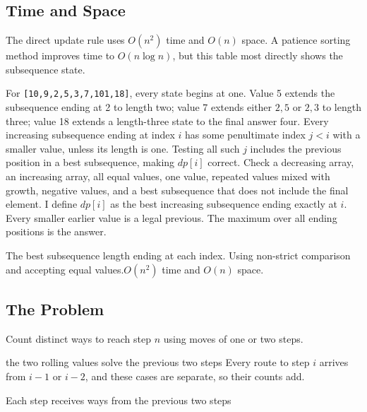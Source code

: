 \subsection{Time and Space}
The direct update rule uses \(O(n^2)\) time and \(O(n)\) space. A patience
sorting method improves time to \(O(n\log n)\), but this table most directly
shows the subsequence state.

\lessonexpansion
  {For \texttt{[10,9,2,5,3,7,101,18]}, every state begins at one. Value 5
   extends the subsequence ending at 2 to length two; value 7 extends either
   \(2,5\) or \(2,3\) to length three; value 18 extends a length-three state
   to the final answer four.}
  {Every increasing subsequence ending at index \(i\) has some penultimate
   index \(j<i\) with a smaller value, unless its length is one. Testing all
   such \(j\) includes the previous position in a best subsequence,
   making \(dp[i]\) correct.}
  {Check a decreasing array, an increasing array, all equal values, one value,
   repeated values mixed with growth, negative values, and a best subsequence
   that does not include the final element.}
  {I define \(dp[i]\) as the best increasing subsequence ending exactly at
   \(i\). Every smaller earlier value is a legal previous. The maximum over
   all ending positions is the answer.}

  {The best subsequence length ending at each index.}
  {Using non-strict comparison and accepting equal values.}{$O(n^2)$ time and $O(n)$ space.}



\subsection{The Problem}
Count distinct ways to reach step \(n\) using moves of one or two steps.

\begin{invariantbox}{the two rolling values solve the previous two steps}
Every route to step \(i\) arrives from \(i-1\) or \(i-2\), and these cases are
separate, so their counts add.
\end{invariantbox}

\begin{visualbox}{Each step receives ways from the previous two steps}
\centering
{}
\end{visualbox}

